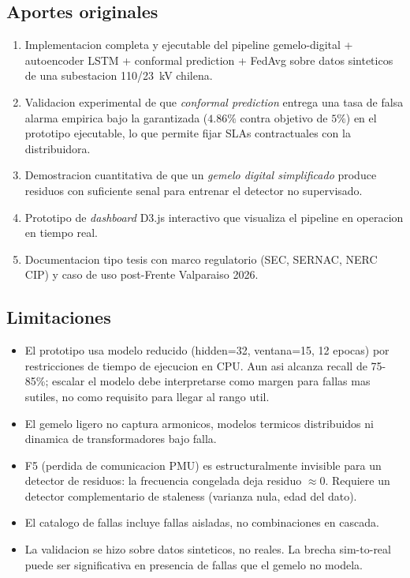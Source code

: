 \subsection{Aportes originales}

\begin{enumerate}[leftmargin=*,itemsep=4pt]
  \item Implementacion completa y ejecutable del pipeline
        gemelo-digital + autoencoder LSTM + conformal prediction +
        FedAvg sobre datos sinteticos de una subestacion 110/23~kV
        chilena.

  \item Validacion experimental de que \emph{conformal prediction}
        entrega una tasa de falsa alarma empirica bajo la
        garantizada ($4.86\%$ contra objetivo de $5\%$) en el
        prototipo ejecutable, lo que permite fijar SLAs contractuales con la
        distribuidora.

  \item Demostracion cuantitativa de que un \emph{gemelo digital
        simplificado} produce residuos con suficiente senal para
        entrenar el detector no supervisado.

  \item Prototipo de \emph{dashboard} D3.js interactivo que
        visualiza el pipeline en operacion en tiempo real.

  \item Documentacion tipo tesis con marco regulatorio (SEC, SERNAC,
        NERC CIP) y caso de uso post-Frente Valparaiso 2026.
\end{enumerate}

\subsection{Limitaciones}

\begin{itemize}[leftmargin=*,itemsep=2pt]
  \item El prototipo usa modelo reducido (hidden=32, ventana=15,
        12 epocas) por restricciones de tiempo de ejecucion en CPU.
        Aun asi alcanza recall de 75-85\%; escalar el modelo debe
        interpretarse como margen para fallas mas sutiles, no como
        requisito para llegar al rango util.
  \item El gemelo ligero no captura armonicos, modelos termicos
        distribuidos ni dinamica de transformadores bajo falla.
  \item F5 (perdida de comunicacion PMU) es estructuralmente
        invisible para un detector de residuos: la frecuencia
        congelada deja residuo $\approx 0$. Requiere un detector
        complementario de staleness (varianza nula, edad del dato).
  \item El catalogo de fallas incluye fallas aisladas, no
        combinaciones en cascada.
  \item La validacion se hizo sobre datos sinteticos, no reales.
        La brecha sim-to-real puede ser significativa en
        presencia de fallas que el gemelo no modela.
\end{itemize}

